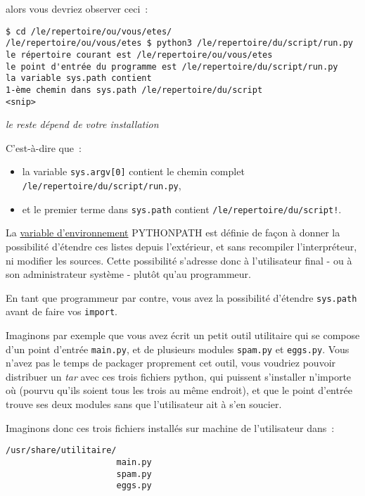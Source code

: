 alors vous devriez observer ceci~:

    \begin{verbatim}
$ cd /le/repertoire/ou/vous/etes/
/le/repertoire/ou/vous/etes $ python3 /le/repertoire/du/script/run.py
le répertoire courant est /le/repertoire/ou/vous/etes
le point d'entrée du programme est /le/repertoire/du/script/run.py
la variable sys.path contient
1-ème chemin dans sys.path /le/repertoire/du/script
<snip>
\end{verbatim}

\emph{le reste dépend de votre installation}

    C'est-à-dire que~:

\begin{itemize}
\tightlist
\item
  la variable \texttt{sys.argv{[}0{]}} contient le chemin complet
  \texttt{/le/repertoire/du/script/run.py},
\item
  et le premier terme dans \texttt{sys.path} contient
  \texttt{/le/repertoire/du/script!}.
\end{itemize}

    La \href{http://en.wikipedia.org/wiki/Environment_variable}{variable
d'environnement} PYTHONPATH est définie de façon à donner la possibilité
d'étendre ces listes depuis l'extérieur, et sans recompiler
l'interpréteur, ni modifier les sources. Cette possibilité s'adresse
donc à l'utilisateur final - ou à son administrateur système - plutôt
qu'au programmeur.

    En tant que programmeur par contre, vous avez la possibilité d'étendre
\texttt{sys.path} avant de faire vos \texttt{import}.

Imaginons par exemple que vous avez écrit un petit outil utilitaire qui
se compose d'un point d'entrée \texttt{main.py}, et de plusieurs modules
\texttt{spam.py} et \texttt{eggs.py}. Vous n'avez pas le temps de
packager proprement cet outil, vous voudriez pouvoir distribuer un
\emph{tar} avec ces trois fichiers python, qui puissent s'installer
n'importe où (pourvu qu'ils soient tous les trois au même endroit), et
que le point d'entrée trouve ses deux modules sans que l'utilisateur ait
à s'en soucier.

Imaginons donc ces trois fichiers installés sur machine de l'utilisateur
dans~:

    \begin{verbatim}
/usr/share/utilitaire/
                      main.py
                      spam.py
                      eggs.py
\end{verbatim}

